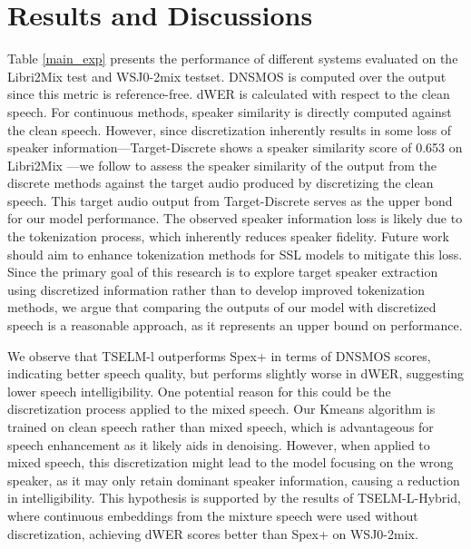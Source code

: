\documentclass[conference]{IEEEtran}
\begin{document}
\section{Results and Discussions}
Table \ref{main_exp} presents the performance of different systems evaluated on the Libri2Mix test and WSJ0-2mix testset. 
DNSMOS is computed over the 
output since this metric is reference-free. dWER is calculated with respect to the clean speech. 
For continuous methods, speaker similarity is directly computed against the clean speech. 
However, since discretization inherently results in some loss of speaker information—Target-Discrete shows a speaker similarity score of 0.653 on Libri2Mix —we follow \cite{dasb} to assess the speaker similarity of the output from the discrete methods against the target audio produced by discretizing the clean speech. 
This target audio output from Target-Discrete serves as the upper bond for our model performance.
The observed speaker information loss is likely due to the tokenization process, which inherently reduces speaker fidelity. Future work should aim to enhance tokenization methods for SSL models to mitigate this loss. Since the primary goal of this research is to explore target speaker extraction using discretized information rather than to develop improved tokenization methods, we argue that comparing the outputs of our model with discretized speech is a reasonable approach, as it represents an upper bound on performance.

We observe that TSELM-l outperforms Spex+ in terms of DNSMOS scores, indicating better speech quality, but performs slightly worse in dWER, suggesting lower speech intelligibility. One potential reason for this could be the discretization process applied to the mixed speech. Our Kmeans algorithm is trained on clean speech rather than mixed speech, which is advantageous for speech enhancement as it likely aids in denoising. However, when applied to mixed speech, this discretization might lead to the model focusing on the wrong speaker, as it may only retain dominant speaker information, causing a reduction in intelligibility.
This hypothesis is supported by the results of TSELM-L-Hybrid, where continuous embeddings from the mixture speech were used without discretization, achieving dWER scores better than Spex+ on WSJ0-2mix. 
\end{document}
